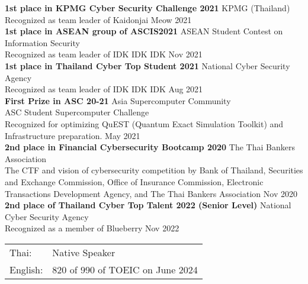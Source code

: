 \textbf{1st place in KPMG Cyber Security Challenge 2021} \hfill KPMG (Thailand)\\
Recognized as team leader of Kaidonjai \hfill Meow 2021\\
\vspace*{2mm}
\textbf{1st place in ASEAN group of ASCIS2021} \hfill ASEAN Student Contest on Information Security\\
Recognized as team leader of IDK IDK IDK \hfill Nov 2021\\
\vspace*{2mm}
\textbf{1st place in Thailand Cyber Top Student 2021} \hfill National Cyber Security Agency\\
Recognized as team leader of IDK IDK IDK \hfill Aug 2021\\
\vspace*{2mm}
\textbf{First Prize in ASC 20-21} \hfill Asia Supercomputer Community\\
ASC Student Supercomputer Challenge\\
Recognized for optimizing QuEST (Quantum Exact Simulation Toolkit) and Infrastructure preparation. \hfill May 2021\\
\vspace*{2mm}
\textbf{2nd place in Financial Cybersecurity Bootcamp 2020} \hfill The Thai Bankers\textquotesingle{} Association\\
The CTF and vision of cybersecurity competition by Bank of Thailand, Securities and Exchange Commission, Office of Insurance Commission, Electronic Transactions Development Agency, and The Thai Bankers\textquotesingle{} Association \hfill Nov 2020\\
\vspace*{2mm}
\textbf{2nd place of Thailand Cyber Top Talent 2022 (Senior Level)} \hfill National Cyber Security Agency\\
Recognized as a member of Blueberry \hfill Nov 2022\\
\vspace{2mm}

\begin{tabular}{ l l }
	Thai: & Native Speaker\\
	English:            & 820 of 990 of TOEIC on June 2024\\
\end{tabular}
\vspace{2mm}
